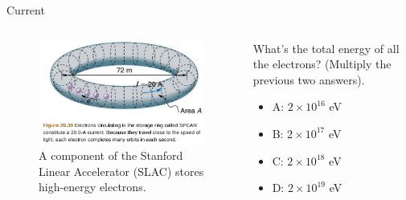 \documentclass{beamer}
\begin{document}
\begin{frame}{Current}
\begin{columns}[T]
\begin{column}{0.5\textwidth}
\begin{figure}
\centering
\includegraphics[width=\textwidth]{figures/SPEAR.png}
\caption{\label{fig:SLAC3} A component of the Stanford Linear Accelerator (SLAC) stores high-energy electrons.}
\end{figure}
\end{column}
\begin{column}{0.5\textwidth}
\small
What's the total energy of all the electrons?  (Multiply the previous two answers).
\begin{itemize}
\item A: $2 \times 10^{16}$ eV
\item B: $2 \times 10^{17}$ eV
\item C: $2 \times 10^{18}$ eV
\item D: $2 \times 10^{19}$ eV
\end{itemize}
\end{column}
\end{columns}
\end{frame}
\end{document}
